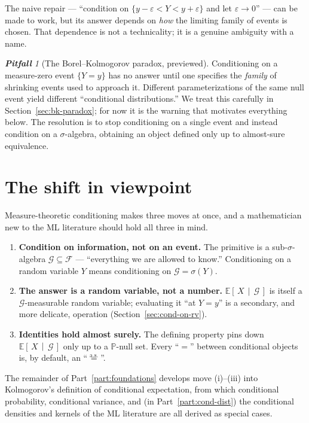 \documentclass[11pt,oneside]{report}
\theoremstyle{plain}
\theoremstyle{definition}
\theoremstyle{remark}
\newtheorem*{warning*}{\textbf{Pitfall}}
\newcommand{\Prob}{\mathbb{P}}
\newcommand{\E}{\mathbb{E}}
\newcommand{\Fcal}{\mathcal{F}}
\newcommand{\Gcal}{\mathcal{G}}
\newcommand{\eqas}{\overset{\text{a.s.}}{=}}
\newcommand{\cE}[2]{\E\!\left[\,#1 \,\middle|\, #2\,\right]}
\numberwithin{equation}{chapter}
\begin{document}
The naive repair --- ``condition on $\{y-\varepsilon<Y<y+\varepsilon\}$ and
let $\varepsilon\to0$'' --- can be made to work, but its answer depends on
\emph{how} the limiting family of events is chosen. That dependence is not
a technicality; it is a genuine ambiguity with a name.

\begin{warning*}[The Borel--Kolmogorov paradox, previewed]
Conditioning on a measure-zero event $\{Y=y\}$ has no answer until one
specifies the \emph{family} of shrinking events used to approach it.
Different parameterizations of the same null event yield different
``conditional distributions.'' We treat this carefully in
Section~\ref{sec:bk-paradox}; for now it is the warning that motivates
everything below. The resolution is to stop conditioning on a single
event and instead condition on a $\sigma$-algebra, obtaining an object
defined only up to almost-sure equivalence.
\end{warning*}

\section{The shift in viewpoint}

Measure-theoretic conditioning makes three moves at once, and a
mathematician new to the ML literature should hold all three in mind.

\begin{enumerate}[label=(\roman*),leftmargin=2.2em]
\item \textbf{Condition on information, not on an event.} The primitive is
a sub-$\sigma$-algebra $\Gcal\subseteq\Fcal$ --- ``everything we are
allowed to know.'' Conditioning on a random variable $Y$ means
conditioning on $\Gcal=\sigma(Y)$.
\item \textbf{The answer is a random variable, not a number.}
$\cE{X}{\Gcal}$ is itself a $\Gcal$-measurable random variable; evaluating
it ``at $Y=y$'' is a secondary, and more delicate, operation
(Section~\ref{sec:cond-on-rv}).
\item \textbf{Identities hold almost surely.} The defining property pins
down $\cE{X}{\Gcal}$ only up to a $\Prob$-null set. Every ``$=$'' between
conditional objects is, by default, an ``$\eqas$''.
\end{enumerate}

The remainder of Part~\ref{part:foundations} develops move (i)--(iii) into
Kolmogorov's definition of conditional expectation, from which conditional
probability, conditional variance, and (in Part~\ref{part:cond-dist}) the
conditional densities and kernels of the ML literature are all derived as
special cases.
\end{document}
